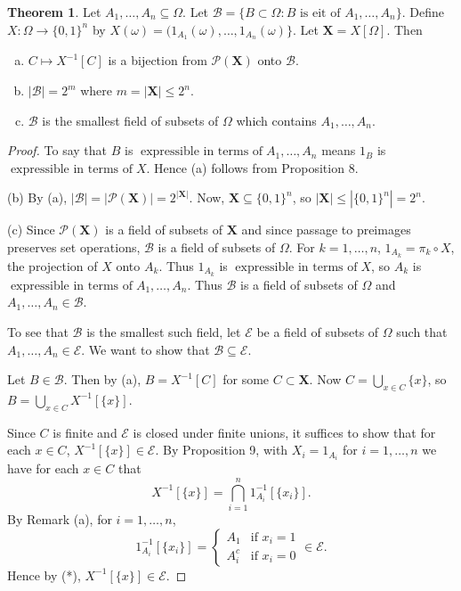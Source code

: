 \documentclass{article}
\DeclareMathOperator{\eit}{\text{expressible in terms of}}
\theoremstyle{definition}
\newtheorem{theorem}{Theorem}
\begin{document}
\begin{theorem}
    Let $A_1, \ldots, A_n \subseteq \Omega$. Let $\mathscr{B} = \{B \subset \Omega : B \text{ is eit of } A_1, \ldots, A_n\}$. Define $X : \Omega \to \{0,1\}^n$ by $X(\omega) = (1_{A_1}(\omega),\dots,1_{A_n}(\omega)\}$.
    Let $\mathbf{X} = X[\Omega]$. Then
    \begin{enumerate}[(a)]
        \item $C \mapsto X^{-1}[C]$ is a bijection from $\mathcal{P}(\mathbf{X})$ onto $\mathscr{B}$.
        \item $|\mathscr{B}| = 2^m$ where $m = |\mathbf{X}| \leq 2^n$.
        \item $\mathscr{B}$ is the smallest field of subsets of $\Omega$ which contains $A_1, \ldots, A_n$.
    \end{enumerate}
\end{theorem}
\begin{proof}
    To say that $B$ is $\eit A_1, \ldots, A_n$ means $1_B$ is $\eit X$. Hence (a) follows from Proposition 8.
    
    (b) By (a), $|\mathscr{B}| = |\mathcal{P}(\mathbf{X})| = 2^{|\mathbf{X}|}$. Now, $\mathbf{X} \subseteq \{0,1\}^n$, so $|\mathbf{X}| \leq |\{0,1\}^n| = 2^n$.
    
    (c) Since $\mathcal{P}(\mathbf{X})$ is a field of subsets of $\mathbf{X}$ and since passage to preimages preserves set operations, $\mathscr{B}$ is a field of subsets of $\Omega$.
    For $k = 1, \ldots, n$, $1_{A_k} = \pi_k \circ X$, the projection of $X$ onto $A_k$. Thus $1_{A_k}$ is $\eit X$, so $A_k$ is $\eit A_1, \ldots, A_n$.
    Thus $\mathscr{B}$ is a field of subsets of $\Omega$ and $A_1, \ldots, A_n \in \mathscr{B}$.
    
    To see that $\mathscr{B}$ is the smallest such field, let $\mathscr{E}$ be a field of subsets of $\Omega$ such that $A_1, \ldots, A_n \in \mathscr{E}$. We want to show that $\mathscr{B} \subseteq \mathscr{E}$.

    Let $B \in \mathscr{B}$. Then by (a), $B = X^{-1}[C]$ for some $C \subset \mathbf{X}$.
    Now $C = \bigcup_{x \in C} \{x\}$, so $B = \bigcup_{x \in C} X^{-1}[\{x\}]$.

    Since $C$ is finite and $\mathscr{E}$ is closed under finite unions, it suffices to show that for each $x \in C$, $X^{-1}[\{x\}] \in \mathscr{E}$. By Proposition 9, with $X_i = 1_{A_i}$ for $i = 1, \ldots, n$ we have for each $x \in C$ that
    \begin{equation}
        X^{-1}[\{x\}] = \bigcap_{i=1}^n 1_{A_i}^{-1}[\{x_i\}]. \tag{*}
    \end{equation}
    By Remark (a), for $i = 1, \ldots, n$,
    \[
        1_{A_i}^{-1}[\{x_i\}]
        = \begin{cases} A_1 &\text{if } x_i = 1 \\ A_i^c &\text{if } x_i = 0 \end{cases}
        \in \mathscr{E}.
    \]
    Hence by (*), $X^{-1}[\{x\}] \in \mathscr{E}$.
\end{proof}
\end{document}
